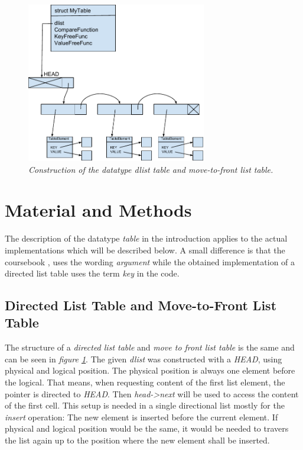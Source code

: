 \documentclass[a4paper,11pt,twoside]{article}
\begin{document}
\begin{figure}[H]
\centering
\includegraphics[width=0.7\textwidth]{figures/dlisttable.pdf}
\caption{\textit{Construction of the datatype dlist table and
    move-to-front list table.}}
\label{fig:dlisttable}
\end{figure}


\section{Material and Methods}
The description of the datatype \emph{table} in the introduction applies to
the actual implementations which will be described below. A small
difference is that the coursebook \cite{janlert2000}, uses the wording
\emph{argument} while the obtained implementation of a directed
list table uses the term \emph{key} in the code.  

\subsection{Directed List Table and Move-to-Front List Table}
The structure of a \emph{directed list table} and \emph{move to front list table} is
the same and can be seen in \textit{figure \ref{fig:dlisttable}}. The given
\emph{dlist} was constructed with a \emph{HEAD}, using physical and logical
position. The physical position is always one element before the logical. 
That means, when requesting content of the first list element, 
the pointer is directed to \emph{HEAD}. Then \emph{head->next}
will be used to access the content of the first cell. This setup is
needed in a single directional list mostly for the \emph{insert} operation:
The new element is inserted before the current element. If physical
and logical position would be the same, it would be needed to travers
the list again up to the position where the new element shall be inserted.
\end{document}
